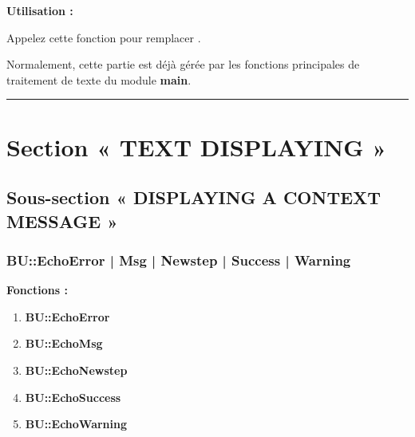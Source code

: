 \documentclass[a4paper,10pt]{article}
\begin{document}
\begin{justify}
    \textbf{Utilisation :}

    Appelez cette fonction pour remplacer .
\end{justify}

\begin{justify}
    Normalement, cette partie est déjà gérée par les fonctions principales de traitement de texte du module \textbf{main}.
\end{justify}





\color{sec1}\par\noindent\rule{\textwidth}{0.4pt}\color{text}

\color{sec1}
\section{Section « TEXT DISPLAYING »}\color{text}

\color{sec2}
\subsection{Sous-section « DISPLAYING A CONTEXT MESSAGE »}\color{text}

\color{sec3}
\subsubsection{BU::EchoError | Msg | Newstep | Success | Warning}\color{text}

\begin{justify}
    \textbf{Fonctions :}
    \begin{enumerate}
        \item \textbf{\color{red}BU::EchoError}
        \item \textbf{\color{text}BU::EchoMsg}
        \item \textbf{\color{orange}BU::EchoNewstep}
        \item \textbf{\color{green}BU::EchoSuccess}
        \item \textbf{\color{yellow}BU::EchoWarning}
    \end{enumerate}
\end{justify}

\end{document}
